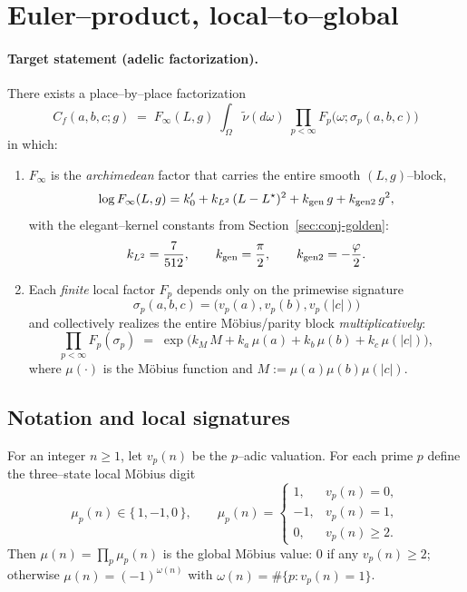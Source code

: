 \documentclass[12pt]{article}
\numberwithin{equation}{section}
\begin{document}

\section{Euler–product, local–to–global}\label{sec:conj-euler}

\paragraph{Target statement (adelic factorization).}
There exists a place–by–place factorization
\[
  \boxed{\quad C_{\!f}(a,b,c;g)\;=\;F_\infty(L,g)\;\int_{\Omega}\tilde\nu(d\omega)\;\prod_{p<\infty} F_p\!\big(\omega;\sigma_p(a,b,c)\big)\quad}
\]
in which:
\begin{enumerate}
  \item $F_\infty$ is the \emph{archimedean} factor that carries the entire smooth $(L,g)$–block,
  \[
     \log F_\infty(L,g)=k_0'+k_{L^2}\,(L-L^\star)^2+k_{\rm gen}\,g+k_{\rm gen2}\,g^2,
  \]
  with the elegant–kernel constants from Section~\ref{sec:conj-golden}:
  \[
  k_{L^2}=\frac{7}{512},\qquad k_{\rm gen}=\frac{\pi}{2},\qquad k_{\rm gen2}=-\frac{\varphi}{2}.
  \]
  \item Each \emph{finite} local factor $F_p$ depends only on the primewise signature
  \[
    \sigma_p(a,b,c) = \big(v_p(a),v_p(b),v_p(|c|)\big)
  \]
  and collectively realizes the entire Möbius/parity block \emph{multiplicatively}:
  \[
    \prod_{p<\infty} F_p(\sigma_p)
    \;=\;
    \exp\!\Big(k_M\,M+k_a\,\mu(a)+k_b\,\mu(b)+k_c\,\mu(|c|)\Big),
  \]
  where $\mu(\cdot)$ is the Möbius function and $M:=\mu(a)\mu(b)\mu(|c|)$.
\end{enumerate}

\bigskip
\subsection*{Notation and local signatures}

For an integer $n\ge 1$, let $v_p(n)$ be the $p$–adic valuation. For each prime $p$ define the
three–state local Möbius digit
\[
\mu_p(n) \in \{\,1,-1,0\,\},\qquad
\mu_p(n)=\begin{cases}
1,& v_p(n)=0,\\
-1,& v_p(n)=1,\\[2pt]
0,& v_p(n)\ge 2.
\end{cases}
\]
Then $\mu(n)=\prod_{p}\mu_p(n)$ is the global Möbius value: $0$ if any $v_p(n)\ge 2$; otherwise $\mu(n)=(-1)^{\omega(n)}$ with $\omega(n)=\#\{p: v_p(n)=1\}$.
\end{document}
